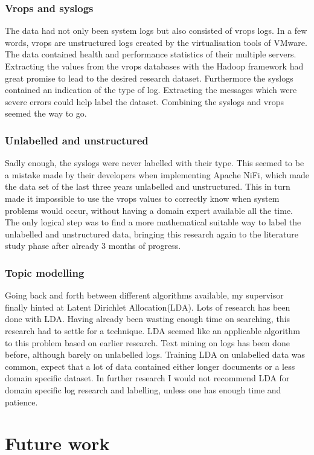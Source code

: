 \subsubsection{Vrops and syslogs}
The data had not only been system logs but also consisted of vrops logs. In a few words, vrops are unstructured logs created by the virtualisation tools of VMware. The data contained health and performance statistics of their multiple servers. Extracting the values from the vrops databases with the Hadoop framework had great promise to lead to the desired research dataset. Furthermore the syslogs contained an indication of the type of log. Extracting the messages which were severe errors could help label the dataset. Combining the syslogs and vrops seemed the way to go. 

\subsubsection{Unlabelled and unstructured}
Sadly enough, the syslogs were never labelled with their type. This seemed to be a mistake made by their developers when implementing Apache NiFi, which made the data set of the last three years unlabelled and unstructured. This in turn made it impossible to use the vrops values to correctly know when system problems would occur, without having a domain expert available all the time. The only logical step was to find a more mathematical suitable way to label the unlabelled and unstructured data, bringing this research again to the literature study phase after already 3 months of progress.

\subsubsection{Topic modelling}
Going back and forth between different algorithms available, my supervisor finally hinted at Latent Dirichlet Allocation(LDA). Lots of research has been done with LDA. Having already been wasting enough time on searching, this research had to settle for a technique. LDA seemed like an applicable algorithm to this problem based on earlier research. Text mining on logs has been done before, although barely on unlabelled logs. Training LDA on unlabelled data was common, expect that a lot of data contained either longer documents or a less domain specific dataset. In further research I would not recommend LDA for domain specific log research and labelling, unless one has enough time and patience. 

\section{Future work}


